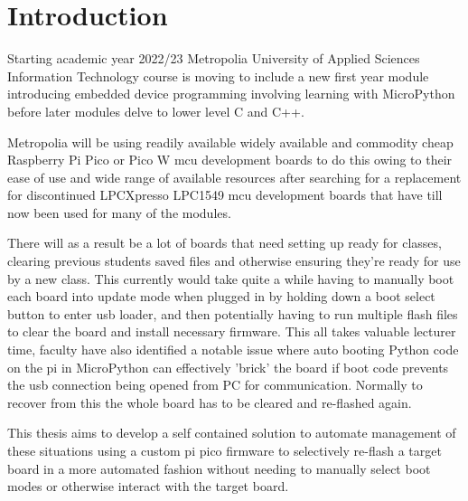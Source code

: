 
\chapter{Introduction}

Starting academic year 2022/23 Metropolia University of Applied Sciences Information Technology course is moving to include a new first year module introducing embedded device programming involving learning with MicroPython before later modules delve to lower level C and C++.

Metropolia will be using readily available widely available and commodity cheap Raspberry Pi Pico or Pico W \gls{mcu}  development boards to do this owing to their ease of use and wide range of available resources after searching for a replacement for discontinued LPCXpresso  LPC1549 \gls{mcu} development boards that have till now been used for many of the modules.

There will as a result be a lot of boards that need setting up ready for classes, clearing previous students saved files and otherwise ensuring they're ready for use by a new class. This currently would take quite a while having to manually boot each board into update mode when plugged in by holding down a boot select button to enter \gls{usb} loader, and then potentially having to run multiple flash files to clear the board and install necessary firmware. This all takes valuable lecturer time, faculty have also identified a notable issue where auto booting Python code on the pi in MicroPython can effectively 'brick' the board if boot code prevents the \gls{usb} connection being opened from PC for communication. Normally to recover from this the whole board has to be cleared and re-flashed again.

This thesis aims to develop a self contained solution to automate management of these situations using a custom pi pico firmware to selectively re-flash a target board in a more automated fashion without needing to manually select boot modes or otherwise interact with the target board.
